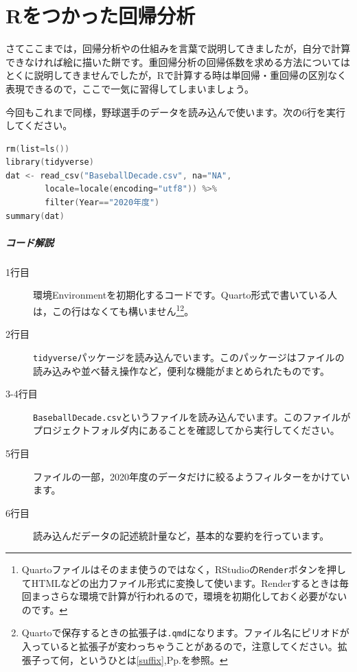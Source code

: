 \documentclass{ltjsbook}
\begin{document}
\VerbatimFootnotes
\chapter{Rをつかった回帰分析}
\label{ch09_Regression_onR}

さてここまでは，回帰分析やの仕組みを言葉で説明してきましたが，自分で計算できなければ絵に描いた餅です。重回帰分析の回帰係数を求める方法についてはとくに説明してきませんでしたが，Rで計算する時は単回帰・重回帰の区別なく表現できるので，ここで一気に習得してしまいましょう。

今回もこれまで同様，野球選手のデータを読み込んで使います。次の6行を実行してください。

\begin{lstlisting}[language=c++,label={code:09_01},caption={データの読み込みと記述統計の確認}]
rm(list=ls())
library(tidyverse)
dat <- read_csv("BaseballDecade.csv", na="NA", 
        locale=locale(encoding="utf8")) %>% 
        filter(Year=="2020年度")
summary(dat)
\end{lstlisting}

\paragraph{コード解説}
\begin{description}
	\item[1行目] 環境Environmentを初期化するコードです。Quarto形式で書いている人は，この行はなくても構いません\footnote{Quartoファイルはそのまま使うのではなく，RStudioの\verb|Render|ボタンを押してHTMLなどの出力ファイル形式に変換して使います。Renderするときは毎回まっさらな環境で計算が行われるので，環境を初期化しておく必要がないのです。}\footnote{Quartoで保存するときの拡張子は\verb|.qmd|になります。ファイル名にピリオドが入っていると拡張子が変わっちゃうことがあるので，注意してください。拡張子って何，というひとは\ref{suffix},Pp.\pageref{suffix}を参照。}。
	\item[2行目] \texttt{tidyverse}パッケージを読み込んでいます。このパッケージはファイルの読み込みや並べ替え操作など，便利な機能がまとめられたものです。
	\item[3-4行目] \texttt{BaseballDecade.csv}というファイルを読み込んでいます。このファイルがプロジェクトフォルダ内にあることを確認してから実行してください。
	\item[5行目] ファイルの一部，2020年度のデータだけに絞るようフィルターをかけています。
	\item[6行目] 読み込んだデータの記述統計量など，基本的な要約を行っています。
\end{description}
\end{document}
